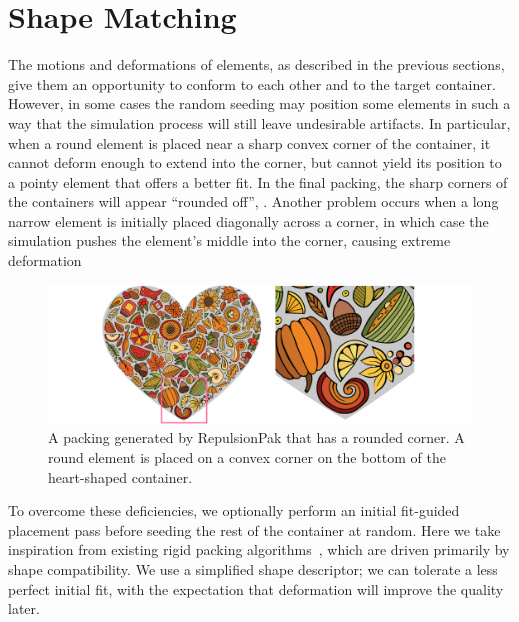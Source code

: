 \section{Shape Matching}
\label{repulsionpak_shape_matching}


The motions and deformations of elements, as described
in the previous sections, give them an opportunity to conform to each 
other and to the target container.  However, in some cases the random 
seeding may position some elements in such a way that the simulation 
process will still leave undesirable artifacts.  In particular, when
a round element is placed near a sharp convex corner of the container,
it cannot deform enough to extend into the corner, but cannot yield its
position to a pointy element that offers a better fit.  In the final
packing, the sharp corners of the containers will appear ``rounded off'', .
Another problem occurs when a long narrow element is initially placed diagonally across a corner, 
in which case the simulation pushes the element's middle into the corner, causing extreme deformation

\begin{figure}  %
\centering
\includegraphics[width=1.0\textwidth]{figures/repulsionpak/rounded.pdf}
\caption[A round element is placed near a sharp convex corner of the container]{
  \label{fig_round}
  \nnewtext
  {
  A packing generated by RepulsionPak that has a rounded corner.
  A round element is placed on a convex corner on the bottom of the heart-shaped container.
  }
}
\end{figure}

To overcome these deficiencies, we optionally perform an initial fit-guided
placement pass before seeding the rest of the container at random. 
Here we take inspiration from existing rigid packing 
algorithms~\cite{Kwan2016}, which are driven primarily by shape 
compatibility.  We use a simplified shape descriptor; we can tolerate
a less perfect initial fit, with the expectation that deformation will
improve the quality later.

